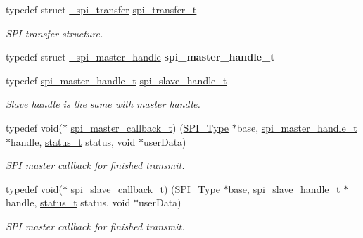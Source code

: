 \begin{DoxyCompactItemize}
typedef struct \mbox{\hyperlink{struct__spi__transfer}{\+\_\+spi\+\_\+transfer}} \mbox{\hyperlink{group__spi__driver_ga59314d5596f240cfbe8b9466bd99ed3f}{spi\+\_\+transfer\+\_\+t}}
\begin{DoxyCompactList}\small\item\em S\+PI transfer structure. \end{DoxyCompactList}\item 
\mbox{\label{group__spi__driver_gafb311d8a8b7de084d82915f5a003a300}} 
typedef struct \mbox{\hyperlink{struct__spi__master__handle}{\+\_\+spi\+\_\+master\+\_\+handle}} {\bfseries spi\+\_\+master\+\_\+handle\+\_\+t}
\item 
\mbox{\label{group__spi__driver_gad267cfee3a876b2860217ff94f03f574}} 
typedef \mbox{\hyperlink{struct__spi__master__handle}{spi\+\_\+master\+\_\+handle\+\_\+t}} \mbox{\hyperlink{group__spi__driver_gad267cfee3a876b2860217ff94f03f574}{spi\+\_\+slave\+\_\+handle\+\_\+t}}
\begin{DoxyCompactList}\small\item\em Slave handle is the same with master handle. \end{DoxyCompactList}\item 
\mbox{\label{group__spi__driver_ga75d9df6e4614756d8ff1bd6f86ca2235}} 
typedef void($\ast$ \mbox{\hyperlink{group__spi__driver_ga75d9df6e4614756d8ff1bd6f86ca2235}{spi\+\_\+master\+\_\+callback\+\_\+t}}) (\mbox{\hyperlink{struct_s_p_i___type}{S\+P\+I\+\_\+\+Type}} $\ast$base, \mbox{\hyperlink{struct__spi__master__handle}{spi\+\_\+master\+\_\+handle\+\_\+t}} $\ast$handle, \mbox{\hyperlink{group__ksdk__common_gaaabdaf7ee58ca7269bd4bf24efcde092}{status\+\_\+t}} status, void $\ast$user\+Data)
\begin{DoxyCompactList}\small\item\em S\+PI master callback for finished transmit. \end{DoxyCompactList}\item 
\mbox{\label{group__spi__driver_ga13fbc3110c56c1d312e4a5ebed07d679}} 
typedef void($\ast$ \mbox{\hyperlink{group__spi__driver_ga13fbc3110c56c1d312e4a5ebed07d679}{spi\+\_\+slave\+\_\+callback\+\_\+t}}) (\mbox{\hyperlink{struct_s_p_i___type}{S\+P\+I\+\_\+\+Type}} $\ast$base, \mbox{\hyperlink{group__spi__driver_gad267cfee3a876b2860217ff94f03f574}{spi\+\_\+slave\+\_\+handle\+\_\+t}} $\ast$handle, \mbox{\hyperlink{group__ksdk__common_gaaabdaf7ee58ca7269bd4bf24efcde092}{status\+\_\+t}} status, void $\ast$user\+Data)
\begin{DoxyCompactList}\small\item\em S\+PI master callback for finished transmit. \end{DoxyCompactList}\end{DoxyCompactItemize}
